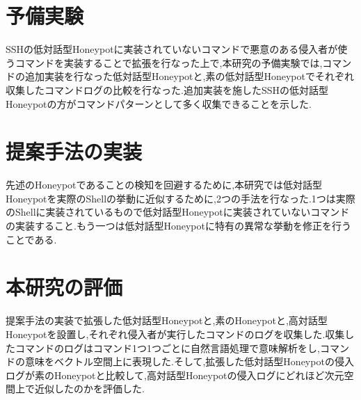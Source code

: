 \section{予備実験}
\label{intr:prex}
SSHの低対話型Honeypotに実装されていないコマンドで悪意のある侵入者が使うコマンドを実装することで拡張を行なった上で,本研究の予備実験では,コマンドの追加実装を行なった低対話型Honeypotと,素の低対話型Honeypotでそれぞれ収集したコマンドログの比較を行なった.追加実装を施したSSHの低対話型Honeypotの方がコマンドパターンとして多く収集できることを示した.

\section{提案手法の実装}
\label{intr:impl}
先述のHoneypotであることの検知を回避するために,本研究では低対話型Honeypotを実際のShellの挙動に近似するために,2つの手法を行なった.1つは実際のShellに実装されているもので低対話型Honeypotに実装されていないコマンドの実装すること.もう一つは低対話型Honeypotに特有の異常な挙動を修正を行うことである.

\section{本研究の評価}
\label{intr:eval}
提案手法の実装で拡張した低対話型Honeypotと,素のHoneypotと,高対話型Honeypotを設置し,それぞれ侵入者が実行したコマンドのログを収集した.収集したコマンドのログはコマンド1つ1つごとに自然言語処理で意味解析をし,コマンドの意味をベクトル空間上に表現した.そして,拡張した低対話型Honeypotの侵入ログが素のHoneypotと比較して,高対話型Honeypotの侵入ログにどれほど次元空間上で近似したのかを評価した.







